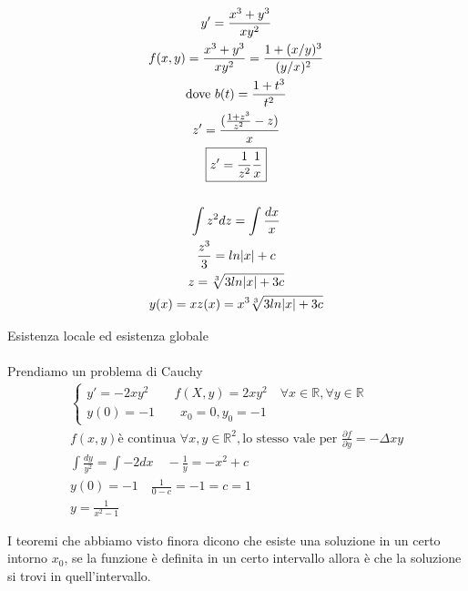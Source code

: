 \documentclass[a4paper, oneside]{article}
\begin{document}
\begin{example}
    \begin{gather*}
        y' = \frac{x^3 + y^3}{xy^2}\\
        f(x,y) = \frac{x^3+y^3}{xy^2} = \frac{1+(x/y)^3}{(y/x)^2}\\
        \text{dove } b(t) = \frac{1+t^3}{t^2}\\
        z' = \frac{(\frac{1 + z^3}{z^2}-z)}{x}\\
        \text{\fbox{$z' = \frac{1}{z^2} \frac{1}{x}$}}\\\\
        \int z^2 dz = \int \frac{dx}{x}\\
        \frac{z^3}{3} = ln|x| + c\\
        z = \sqrt[3]{3ln|x| + 3c}\\
        y(x) = x z(x) = x^3 \sqrt[3]{3ln|x| + 3c}
    \end{gather*}
\end{example}

\begin{proposition}
    Esistenza locale ed esistenza globale\\\\
    Prendiamo un problema di Cauchy
    \begin{gather*}
        \begin{cases}
            y' = -2 x y^2 \qquad f(X,y) = 2xy^2 \quad \forall x \in \mathbb{R} , \forall y \in \mathbb{R}\\
            y(0) = -1 \qquad x_0 = 0, y_0 = -1
        \end{cases}
        \\f(x,y) \text{è continua } \forall x,y \in \mathbb{R}^2, \text{lo stesso vale per } \frac{\partial f}{\partial y} = -\Delta xy\\
        \int \frac{dy}{y^2} = \int -2 dx \quad -\frac{1}{y} = -x^2 + c\\
        y(0) = -1 \quad \frac{1}{0-c} = -1 = c = 1\\
        y= \frac{1}{x^2 - 1}
    \end{gather*}

    I teoremi che abbiamo visto finora dicono che esiste una soluzione in un certo intorno $x_0$, se la funzione è definita in un certo intervallo allora è  che la soluzione si trovi in quell'intervallo.
\end{proposition}
\end{document}
